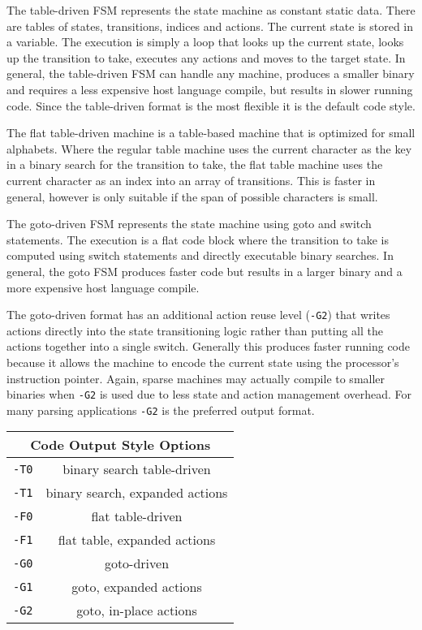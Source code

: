 \documentclass[letterpaper,11pt,oneside]{book}
\newcommand{\verbspace}{\vspace{10pt}}
\begin{document}
The table-driven FSM represents the state machine as constant static data. There are
tables of states, transitions, indices and actions. The current state is
stored in a variable. The execution is simply a loop that looks up the current
state, looks up the transition to take, executes any actions and moves to the
target state. In general, the table-driven FSM can handle any machine, produces
a smaller binary and requires a less expensive host language compile, but
results in slower running code.  Since the table-driven format is the most
flexible it is the default code style.

The flat table-driven machine is a table-based machine that is optimized for
small alphabets. Where the regular table machine uses the current character as
the key in a binary search for the transition to take, the flat table machine
uses the current character as an index into an array of transitions. This is
faster in general, however is only suitable if the span of possible characters
is small.

The goto-driven FSM represents the state machine using goto and switch
statements. The execution is a flat code block where the transition to take is
computed using switch statements and directly executable binary searches.  In
general, the goto FSM produces faster code but results in a larger binary and a
more expensive host language compile.

The goto-driven format has an additional action reuse level (\verb|-G2|) that
writes actions directly into the state transitioning logic rather than putting
all the actions together into a single switch. Generally this produces faster
running code because it allows the machine to encode the current state using
the processor's instruction pointer. Again, sparse machines may actually
compile to smaller binaries when \verb|-G2| is used due to less state and
action management overhead. For many parsing applications \verb|-G2| is the
preferred output format.

\verbspace
\begin{center}
\begin{tabular}{|c|c|}
\hline
\multicolumn{2}{|c|}{\bf Code Output Style Options} \\
\hline
\verb|-T0|&binary search table-driven\\
\hline
\verb|-T1|&binary search, expanded actions\\
\hline
\verb|-F0|&flat table-driven\\
\hline
\verb|-F1|&flat table, expanded actions\\
\hline
\verb|-G0|&goto-driven\\
\hline
\verb|-G1|&goto, expanded actions\\
\hline
\verb|-G2|&goto, in-place actions\\
\hline
\end{tabular}
\end{center}
\end{document}
